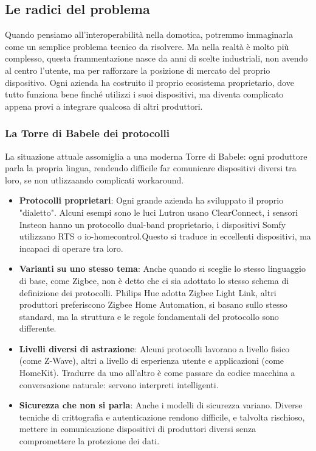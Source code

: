 \subsection{Le radici del problema}
Quando pensiamo all’interoperabilità nella domotica, potremmo immaginarla come un semplice problema tecnico da risolvere. Ma nella realtà è molto più complesso, questa frammentazione nasce da anni di scelte industriali, non avendo al centro l'utente, ma per rafforzare la posizione di mercato del proprio dispositivo. Ogni azienda ha costruito il proprio ecosistema proprietario, dove tutto funziona bene finché utilizzi i suoi dispositivi, ma diventa complicato appena provi a integrare qualcosa di altri produttori.

\subsubsection{La Torre di Babele dei protocolli}
La situazione attuale assomiglia a una moderna Torre di Babele: ogni produttore parla la propria lingua, rendendo difficile far comunicare dispositivi diversi tra loro, se non utlizzaando complicati workaround.

\begin{itemize}
\item \textbf{Protocolli proprietari}: Ogni grande azienda ha sviluppato il proprio "dialetto". Alcuni esempi sono  le luci Lutron usano ClearConnect, i sensori Insteon hanno un protocollo dual-band proprietario, i dispositivi Somfy utilizzano RTS o io-homecontrol.Questo si traduce in eccellenti dispositivi, ma incapaci di operare tra loro.

\item \textbf{Varianti su uno stesso tema}: Anche quando si sceglie lo stesso linguaggio di base, come Zigbee, non è detto che ci sia adottato lo stesso schema di definizione dei protocolli. Philips Hue adotta Zigbee Light Link, altri produttori preferiscono Zigbee Home Automation, si basano sullo stesso standard, ma la struttura e le regole fondamentali del protocollo sono differente.

\item \textbf{Livelli diversi di astrazione}: Alcuni protocolli lavorano a livello fisico (come Z-Wave), altri a livello di esperienza utente e applicazioni (come HomeKit). Tradurre da uno all’altro è come passare da codice macchina a conversazione naturale: servono interpreti intelligenti.

\item \textbf{Sicurezza che non si parla}: Anche i modelli di sicurezza variano. Diverse tecniche di crittografia e autenticazione rendono difficile, e talvolta rischioso, mettere in comunicazione dispositivi di produttori diversi senza compromettere la protezione dei dati.
\end{itemize}

